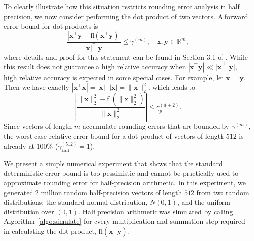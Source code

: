 \documentclass[review,onefignum,onetabnum]{siamart190516}
\newcommand{\R}{\mathbb{R}}
\newcommand{\bb}[1]{\mathbf{#1}}
\newcommand{\fl}{\mathrm{fl}}
\begin{document}
To clearly illustrate how this situation restricts rounding error analysis in half precision, we now consider performing the dot product of two vectors.
A forward error bound for dot products is
\begin{equation}
\frac{|\bb{x}^{\top}\bb{y} - \fl(\bb{x}^{\top}\bb{y})|}{|\bb{x}|^{\top}|\bb{y}|} \leq \gamma^{(m)}, \quad \bb{x},\bb{y}\in\R^{m},
\label{eqn:DDerr}
\end{equation}
where details and proof for this statement can be found in Section 3.1 of \cite{Higham2002}.
While this result does not guarantee a high relative accuracy when $|\bb{x}^{\top}\bb{y}| \ll |\bb{x}|^{\top}|\bb{y}|$, high relative accuracy is expected in some special cases.
For example, let $\bb{x}=\bb{y}$.
Then we have exactly $|\bb{x}^{\top}\bb{x}| = |\bb{x}|^{\top}|\bb{x}|=\|\bb{x}\|_2^2$, which leads to
\begin{equation}
\left|\frac{\|\bb{x}\|_2^2 - \fl(\|\bb{x}\|_2^2)}{\|\bb{x}\|_2^2}\right| \leq \gamma_p^{(d+2)}.
\end{equation}
Since vectors of length $m$ accumulate rounding errors that are bounded by $\gamma^{(m)}$, the worst-case relative error bound for a dot product of vectors of length $512$ is already at 100\% ($\gamma_{\text{half}}^{(512)}=1$). \par

We present a simple numerical experiment that shows that the standard deterministic error bound is too pessimistic and cannot be practically used to approximate rounding error for half-precision arithmetic. 
In this experiment, we generated 2 million random half-precision vectors of length $512$ from two random distributions: the standard normal distribution, $N(0,1)$, and the uniform distribution over $(0,1)$.
Half precision arithmetic was simulated by calling Algorithm~\ref{algo:simulate} for every multiplication and summation step required in calculating the dot product, $\fl(\bb{x}^{\top}\bb{y})$.

\end{document}
